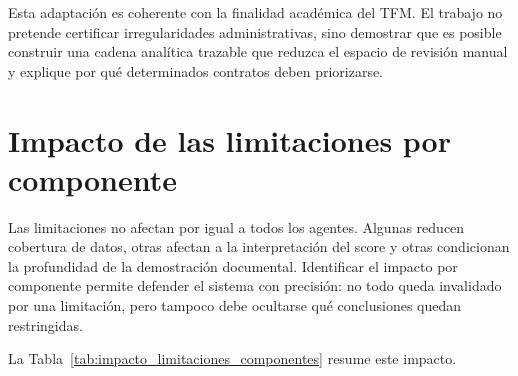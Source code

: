 \documentclass[11pt,a4paper,spanish]{book}
\numberwithin{equation}{chapter}
\numberwithin{figure}{chapter}
\begin{document}
Esta adaptaci{\'o}n es coherente con la finalidad acad{\'e}mica del TFM. El trabajo no pretende
certificar irregularidades administrativas, sino demostrar que es posible construir una cadena
anal{\'i}tica trazable que reduzca el espacio de revisi{\'o}n manual y explique por qu{\'e} determinados
contratos deben priorizarse.

\section{Impacto de las limitaciones por componente}
\label{sec:impacto_limitaciones_componente}

Las limitaciones no afectan por igual a todos los agentes. Algunas reducen cobertura de datos, otras
afectan a la interpretaci{\'o}n del score y otras condicionan la profundidad de la demostraci{\'o}n
documental. Identificar el impacto por componente permite defender el sistema con precisi{\'o}n: no
todo queda invalidado por una limitaci{\'o}n, pero tampoco debe ocultarse qu{\'e} conclusiones quedan
restringidas.

La Tabla~\ref{tab:impacto_limitaciones_componentes} resume este impacto.
\end{document}
